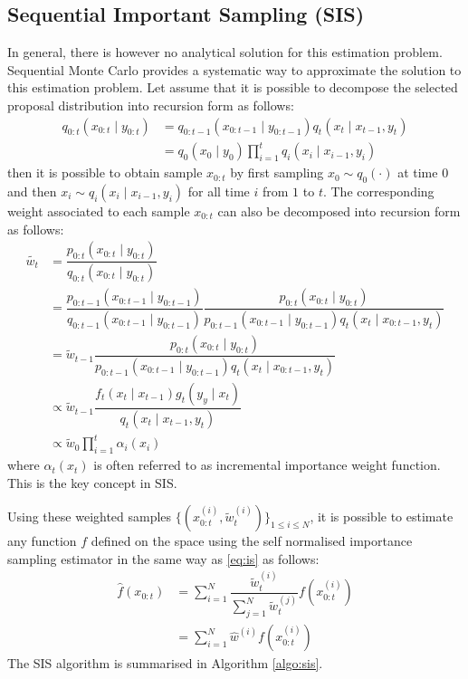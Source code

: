 \subsection{Sequential Important Sampling (SIS)}
\label{sec:SIS}
In general, there is however no analytical solution for this estimation problem. Sequential Monte Carlo provides a systematic way to approximate the solution to this estimation problem. Let assume that it is possible to decompose the selected proposal distribution into recursion form as follows:
\begin{align}
	q_{0:t}(x_{0:t} \mid y_{0:t}) &= q_{0:t-1}(x_{0:t-1} \mid y_{0:t-1}) q_t(x_t \mid x_{t-1}, y_t) \nonumber \\
	             &= q_0(x_0 \mid y_0) \prod^t_{i=1} q_i(x_i \mid x_{i-1}, y_{i})
\label{eq:q}
\end{align}
then it is possible to obtain sample ${x_{0:t}}$ by first sampling $x_0 \sim q_0(\cdot)$ at time $0$ and then $x_i \sim q_i(x_i \mid x_{i-1}, y_i)$ for all time $i$ from $1$ to $t$. The corresponding weight associated to each sample $x_{0:t}$ can also be decomposed into recursion form as follows:
\begin{align}
  \tilde{w_t} &= \dfrac{p_{0:t}(x_{0:t} \mid y_{0:t})}{q_{0:t}(x_{0:t} \mid y_{0:t})} \nonumber \\
              &= \dfrac{p_{0:t-1}(x_{0:t-1} \mid y_{0:t-1})}{q_{0:t-1}(x_{0:t-1} \mid y_{0:t-1})} \dfrac{p_{0:t}(x_{0:t} \mid y_{0:t})}{p_{0:t-1}(x_{0:t-1} \mid y_{0:t-1})q_t(x_t \mid x_{0:t-1}, y_t)} \nonumber \\
              &= \tilde{w}_{t-1} \dfrac{p_{0:t}(x_{0:t} \mid y_{0:t})}{p_{0:t-1}(x_{0:t-1} \mid y_{0:t-1})q_t(x_t \mid x_{0:t-1}, y_t)} \nonumber \\
              &\propto \tilde{w}_{t-1} \dfrac{f_t(x_t \mid x_{t-1})g_t(y_y \mid x_t)}{q_t(x_t \mid x_{t-1}, y_t)} \label{eq:w} \\
              &\propto \tilde{w}_0 \prod^t_{i=1} \alpha_i(x_{i})          
\end{align}
where $\alpha_t(x_{t})$  is often referred to as incremental importance weight function. This is the key concept in SIS.

Using these weighted samples $\{(x^{(i)}_{0:t}, \tilde{w}^{(i)}_t)\}_{1 \leq i \leq N}$, it is possible to estimate any function $f$ defined on the space using the self normalised importance sampling estimator in the same way as \eqref{eq:is} as follows:
\begin{align}
  \hat{f}(x_{0:t}) &= \sum^N_{i=1} \dfrac{\tilde{w}^{(i)}_t}{\sum^N_{j=1}\tilde{w}^{(j)}_t} f(x^{(i)}_{0:t}) \nonumber \\
   &= \sum^N_{i=1} \hat{w}^{(i)} f(x^{(i)}_{0:t})
\end{align}
The SIS algorithm is summarised in Algorithm \ref{algo:sis}.

